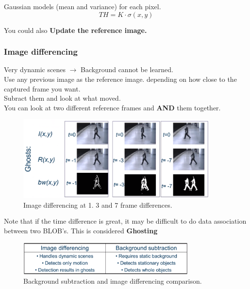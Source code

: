 \documentclass[a4paper]{article}
\begin{document}
\vspace{5pt}
Gaussian models (mean and variance) for each pixel.
\begin{equation}
TH = K \cdot \sigma(x,y)
\end{equation}


 You could also\textbf{ Update the reference image.} 

 

\subsubsection{Image differencing}
Very dynamic scenes $ \rightarrow $ Background cannot be learned.\\
Use any previous image as the reference image. depending on how close to the captured frame you want. \\
Subract them and look at what moved. \\
You can look at two different reference frames and \textbf{AND} them together.
\begin{figure}[H]
\centering
\includegraphics[width=0.9\textwidth]{figures/Image_differencing.png}
\caption{Image differencing at 1. 3 and 7 frame differences.}
\label{fig:image_differencing}
\end{figure} 

Note that if the time difference is great, it may be difficult to do data association between two BLOB's. This is considered \textbf{Ghosting} 

\begin{figure}[H]
\centering
\includegraphics[width=0.8\textwidth]{figures/Background_image_differencing_comparison_table.png}
\caption{Background subtraction and image differencing comparison.}
\label{fig:Background_Imagedifferincing_comparrison}
\end{figure} 
\end{document}
